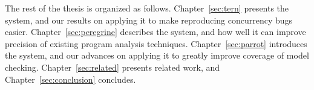 The rest of the thesis is organized as follows. Chapter~\ref{sec:tern} presents
the \tern system, and our results on applying it to make reproducing concurrency
bugs easier. Chapter~\ref{sec:peregrine} describes the \peregrine system, and
how well it can improve precision of existing program analysis techniques.
Chapter~\ref{sec:parrot} introduces the \parrot system, and our advances on
applying it to greatly improve coverage of model checking.
Chapter~\ref{sec:related} presents related work, and
Chapter~\ref{sec:conclusion} concludes.



